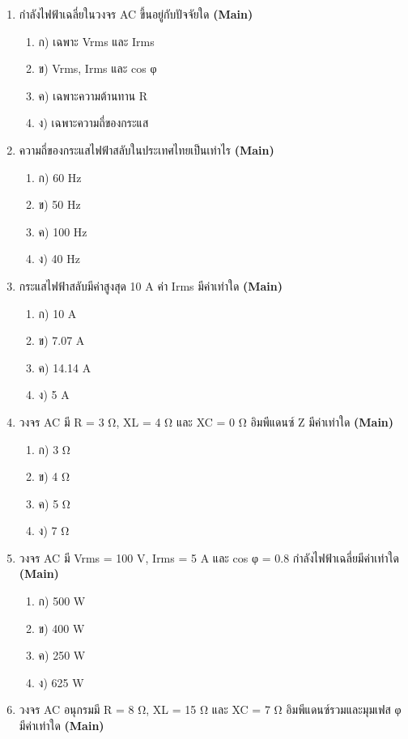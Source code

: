 \documentclass[12pt]{article}
\begin{document}
\begin{enumerate}[label=\arabic*.]
\item กำลังไฟฟ้าเฉลี่ยในวงจร AC ขึ้นอยู่กับปัจจัยใด \hfill \textbf{\small (Main)}
\begin{enumerate}[label=)]
\item ก) เฉพาะ Vrms และ Irms
\item ข) Vrms, Irms และ cos φ
\item ค) เฉพาะความต้านทาน R
\item ง) เฉพาะความถี่ของกระแส
\end{enumerate}
\item ความถี่ของกระแสไฟฟ้าสลับในประเทศไทยเป็นเท่าไร \hfill \textbf{\small (Main)}
\begin{enumerate}[label=)]
\item ก) 60 Hz
\item ข) 50 Hz
\item ค) 100 Hz
\item ง) 40 Hz
\end{enumerate}
\item กระแสไฟฟ้าสลับมีค่าสูงสุด 10 A ค่า Irms มีค่าเท่าใด \hfill \textbf{\small (Main)}
\begin{enumerate}[label=)]
\item ก) 10 A
\item ข) 7.07 A
\item ค) 14.14 A
\item ง) 5 A
\end{enumerate}
\item วงจร AC มี R = 3 Ω, XL = 4 Ω และ XC = 0 Ω อิมพีแดนซ์ Z มีค่าเท่าใด \hfill \textbf{\small (Main)}
\begin{enumerate}[label=)]
\item ก) 3 Ω
\item ข) 4 Ω
\item ค) 5 Ω
\item ง) 7 Ω
\end{enumerate}
\item วงจร AC มี Vrms = 100 V, Irms = 5 A และ cos φ = 0.8 กำลังไฟฟ้าเฉลี่ยมีค่าเท่าใด \hfill \textbf{\small (Main)}
\begin{enumerate}[label=)]
\item ก) 500 W
\item ข) 400 W
\item ค) 250 W
\item ง) 625 W
\end{enumerate}
\item วงจร AC อนุกรมมี R = 8 Ω, XL = 15 Ω และ XC = 7 Ω อิมพีแดนซ์รวมและมุมเฟส φ มีค่าเท่าใด \hfill \textbf{\small (Main)}
\begin{enumerate}[label=)]

\end{enumerate}
\end{enumerate}
\end{document}

